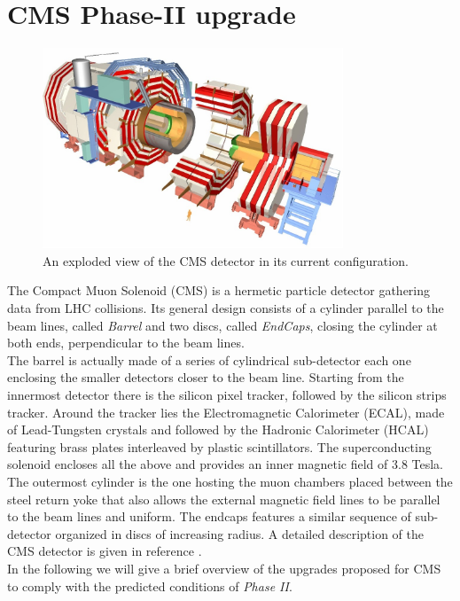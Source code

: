 \section{CMS Phase-II upgrade}
\begin{figure}
\centerline{\includegraphics[width=0.8\textwidth]{intro/cms.jpg}}
\caption{An exploded view of the CMS detector in its current configuration.}
\label{cms}
\end{figure}

The Compact Muon Solenoid (CMS) is a hermetic particle detector gathering data from LHC collisions. Its general design consists of a cylinder parallel to the beam lines, called \textit{Barrel} and two discs, called \textit{EndCaps}, closing the cylinder at both ends, perpendicular to the beam lines.\\
The barrel is actually made of a series of cylindrical sub-detector each one enclosing the smaller detectors closer to the beam line. Starting from the innermost detector there is the silicon pixel tracker, followed by the silicon strips tracker. Around the tracker lies the Electromagnetic Calorimeter (ECAL), made of Lead-Tungsten crystals and followed by the Hadronic Calorimeter (HCAL) featuring brass plates interleaved by plastic scintillators. The superconducting solenoid encloses all the above and provides an inner magnetic field of 3.8 Tesla. The outermost cylinder is the one hosting the muon chambers placed between the steel return yoke that also allows the external magnetic field lines to be parallel to the beam lines and uniform. The endcaps features a similar sequence of sub-detector organized in discs of increasing radius. A detailed description of the CMS detector is given in reference \cite{cms}.\\

In the following we will give a brief overview of the upgrades proposed for CMS to comply with the predicted conditions of \textit{Phase II}.

